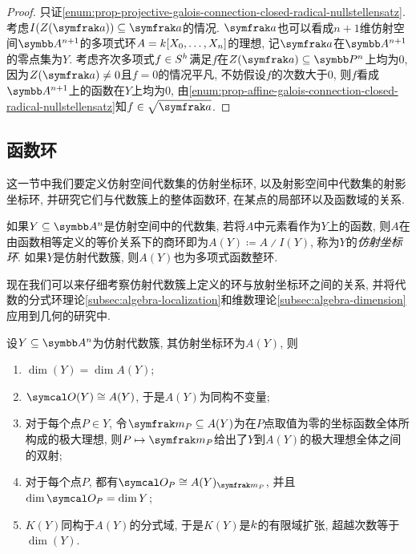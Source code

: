 \begin{proof}
  只证\ref{enum:prop-projective-galois-connection-closed-radical-nullstellensatz}. 考虑$I(Z(\ideal{a}))\subseteq\ideal{a}$的情况. $\ideal{a}$也可以看成$n+1$维仿射空间$\AF^{n+1}$的多项式环$A=k [X_0, \dotsc, X_n]$的理想, 记$\ideal{a}$在$\AF^{n+1}$的零点集为$Y$. 考虑齐次多项式$f\in S^h$满足$f$在$Z(\ideal{a})\subseteq \PP^n$上均为0, 因为$Z(\ideal{a})\neq 0$且$f=0$的情况平凡, 不妨假设$f$的次数大于0, 则$f$看成$\AF^{n+1}$上的函数在$Y$上均为0, 由\ref{enum:prop-affine-galois-connection-closed-radical-nullstellensatz}知$f\in\sqrt{\ideal{a}}$.
\end{proof}

\subsection{函数环}\label{subsec:functionrings}

这一节中我们要定义仿射空间代数集的仿射坐标环, 以及射影空间中代数集的射影坐标环, 并研究它们与代数簇上的整体函数环, 在某点的局部环以及函数域的关系.

如果$Y\subseteq \AF^n$是仿射空间中的代数集, 若将$A$中元素看作为$Y$上的函数, 则$A$在由函数相等定义的等价关系下的商环即为$A(Y)\coloneq A{\divslash}I(Y)$, 称为$Y$的\emph{仿射坐标环}. 如果$Y$是仿射代数簇, 则$A(Y)$也为多项式函数整环.

现在我们可以来仔细考察仿射代数簇上定义的环与放射坐标环之间的关系, 并将代数的分式环理论\ref{subsec:algebra-localization}和维数理论\ref{subsec:algebra-dimension}应用到几何的研究中.

\begin{theorem}\label{thm:affinerings}
  设$Y\subseteq \AF^n$为仿射代数簇, 其仿射坐标环为$A(Y)$, 则
  \begin{enumerate}
    \item\label{enum:thm-affine-rings-1} $\dim (Y)=\dim A(Y)$;
    \item\label{enum:thm-affine-rings-2} $\OO (Y)\cong A(Y)$, 于是$A(Y)$为同构不变量;
    \item\label{enum:thm-affine-rings-3} 对于每个点$P\in Y$, 令$\ideal{m}_P\subseteq A(Y)$为在$P$点取值为零的坐标函数全体所构成的极大理想, 则$P\mapsto \ideal{m}_P$给出了$Y$到$A(Y)$的极大理想全体之间的双射;
    \item\label{enum:thm-affine-rings-4} 对于每个点$P$, 都有$\OO_P\cong A(Y)_{\ideal{m}_P}$, 并且$\dim \OO_P=\dim Y$;
    \item\label{enum:thm-affine-rings-5} $K(Y)$同构于$A(Y)$的分式域, 于是$K(Y)$是$k$的有限域扩张, 超越次数等于$\dim (Y)$.
  \end{enumerate}
\end{theorem}

